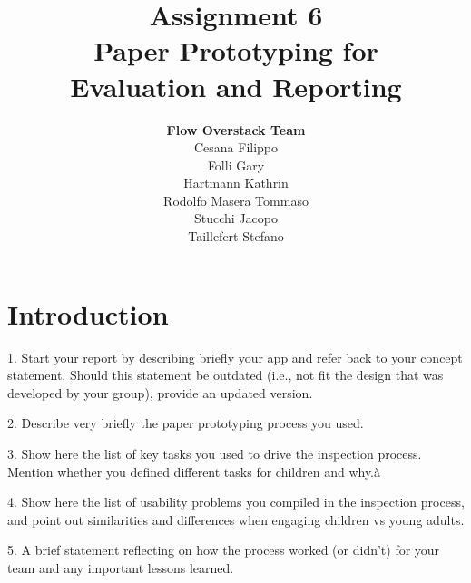 \documentclass[12pt]{scrartcl}
\title{Assignment 6\\ Paper Prototyping for\\ Evaluation and Reporting}
\author{\textbf{Flow Overstack Team}\\ Cesana Filippo\\ Folli Gary\\ Hartmann Kathrin\\ Rodolfo Masera Tommaso\\ Stucchi Jacopo\\ Taillefert Stefano}
\date{}
\begin{document}
\maketitle

\tableofcontents

\newpage

\section{Introduction}

	1.     Start your report by describing briefly your app and refer back to your concept statement. Should this statement be outdated (i.e., not fit the design that was developed by your group), provide an updated version.

	2.     Describe very briefly the paper prototyping process you used.

	3.     Show here the list of key tasks you used to drive the inspection process. Mention whether you defined different tasks for children and why.à

	4.     Show here the list of usability problems you compiled in the inspection process, and point out similarities and differences when engaging children vs young adults.

	5.     A brief statement reflecting on how the process worked (or didn't) for your team and any important lessons learned.
	
	
  

	
	
\end{document}
